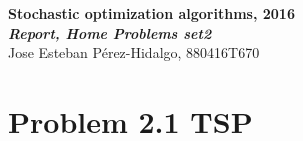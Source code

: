 \documentclass[18pt,a4paper]{article}
\begin{document}
\begin{framed}
\begin{center}
{\bf \large {Stochastic optimization algorithms, 2016}}\\
		{\large\noindent\em\bf Report, Home Problems set2}\\
		Jose Esteban Pérez-Hidalgo, 880416T670


		
\end{center}
\end{framed}

\section*{Problem 2.1 TSP}
\end{document}
